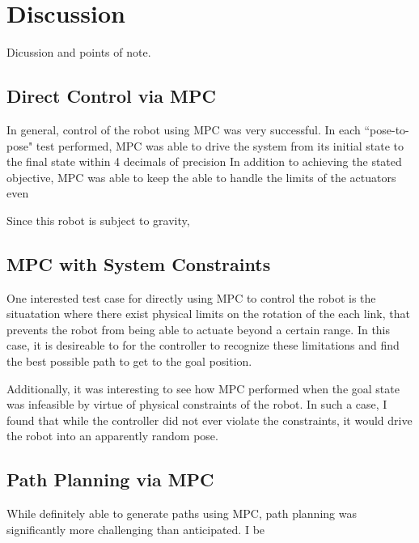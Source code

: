 \documentclass[journal]{IEEEtran}
\begin{document}
\subsection{}

\section{Discussion}

Dicussion and points of note.


\subsection{Direct Control via MPC}

In general, control of the robot using MPC was very successful. In each ``pose-to-pose" test performed, MPC was able to drive the system from its initial state to the final state within 4 decimals of precision In addition to achieving the stated objective, MPC was able to keep the able to handle the limits of the actuators even

Since this robot is subject to gravity,

\subsection{MPC with System Constraints}

One interested test case for directly using MPC to control the robot is the situatation where there exist physical limits on the rotation of the each link, that prevents the robot from being able to actuate beyond a certain range. In this case, it is desireable to for the controller to recognize these limitations and find the best possible path to get to the goal position.





Additionally, it was interesting to see how MPC performed when the goal state was infeasible by virtue of physical constraints of the robot. In such a case, I found that while the controller did not ever violate the constraints, it would drive the robot into an apparently random pose.


\subsection{Path Planning via MPC}

While definitely able to generate paths using MPC, path planning was significantly more challenging than anticipated. I be
\end{document}
